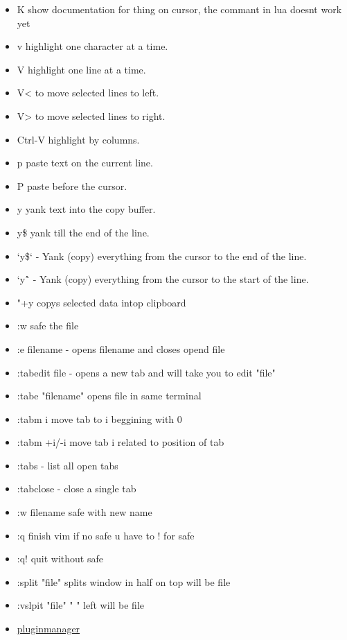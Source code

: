 \documentclass[12pt]{article}
\begin{document}
\begin{itemize}
    \item K show documentation for thing on cursor, the commant in lua doesnt work yet 
    \item v highlight one character at a time.
    \item V highlight one line at a time.
    \item V< to move selected lines to left.
    \item V> to move selected lines to right.
    \item Ctrl-V highlight by columns.
    \item p paste text on the current line.
    \item P paste before the cursor.
    \item y yank text into the copy buffer.
    \item y\$ yank till the end of the line.
    \item `y\$` - Yank (copy) everything from the cursor to the end of the line.
    \item `y\^` - Yank (copy) everything from the cursor to the start of the line.\\
    \item "+y copys selected data intop clipboard \\
\end{itemize}
\begin{itemize}
    \item :w  safe the file
    \item :e filename - opens filename and closes opend file
    \item :tabedit file - opens a new tab and will take you to edit "file"
    \item :tabe "filename" opens file in same terminal 
    \item :tabm i move tab to i beggining with 0
    \item :tabm +i/-i move tab i related to position of tab
    \item :tabs - list all open tabs
    \item :tabclose - close a single tab
    \item :w filename safe with new name
    \item :q finish vim if no safe u have to ! for safe
    \item :q! quit without safe
    \item :split "file" splits window in half on top will be file
    \item :vslpit "file" "                      " left will be file
    \item \href{https://github.com/junegunn/vim-plug}{pluginmanager}
\end{itemize}
\end{document}
